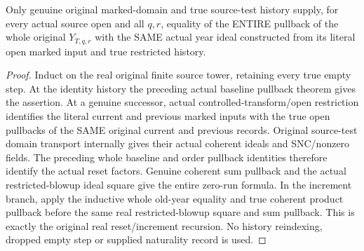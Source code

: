 \begin{theorem}
\label{hir:original-coherent-history-year-entire-open-pullback}
\leanok
{}
Only genuine original marked-domain and true source-test history supply,
for every actual source open and all $q,r$, equality of the ENTIRE pullback
of the whole original $Y_{T,q,r}$ with the SAME actual year ideal constructed
from its literal open marked input and true restricted history.
\end{theorem}
\begin{proof}
Induct on the real original finite source tower, retaining every true empty
step. At the identity history the preceding actual baseline pullback theorem
gives the assertion. At a genuine successor, actual controlled-transform/open
restriction identifies the literal current and previous marked inputs with the
true open pullbacks of the SAME original current and previous records. Original
source-test domain transport internally gives their actual coherent ideals and
SNC/nonzero fields. The preceding whole baseline and order pullback identities
therefore identify the actual reset factors. Genuine coherent sum pullback
and the actual restricted-blowup ideal square give the entire zero-run formula.
In the increment branch, apply the inductive whole old-year equality and true
coherent product pullback before the same real restricted-blowup square and sum
pullback. This is exactly the original real reset/increment recursion. No
history reindexing, dropped empty step or supplied naturality record is used.
\end{proof}

